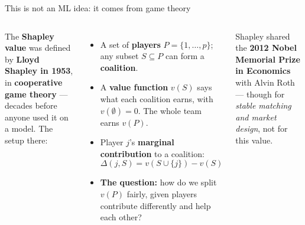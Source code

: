 \documentclass[aspectratio=169]{beamer}
\begin{document}
\begin{frame}{This is not an ML idea: it comes from game theory}
  \begin{columns}[T]
    The \textbf{Shapley value} was defined by \textbf{Lloyd Shapley in 1953}, in
    \textbf{cooperative game theory} --- decades before anyone used it on a model.
    \vskip 4pt
    The setup there:
    \begin{itemize}\small
      \item A set of \textbf{players} $P = \{1,\dots,p\}$; any subset $S \subseteq P$ can form a
        \textbf{coalition}.
      \item A \textbf{value function} $v(S)$ says what each coalition earns, with
        $v(\emptyset) = 0$. The whole team earns $v(P)$.
      \item Player $j$'s \textbf{marginal contribution} to a coalition:
        \[ \Delta(j, S) = v(S \cup \{j\}) - v(S) \]
      \item \textbf{The question:} how do we split $v(P)$ fairly, given players contribute
        differently and help each other?
    \end{itemize}
    \vskip 6pt
    \footnotesize Shapley shared the \textbf{2012 Nobel Memorial Prize in Economics} with Alvin
    Roth --- though for \emph{stable matching and market design}, not for this value.
  \end{columns}
\end{frame}
\end{document}
